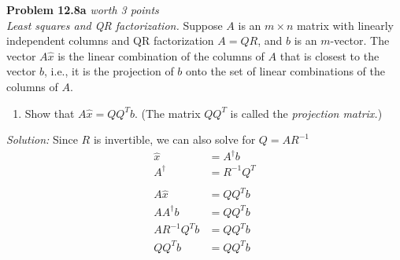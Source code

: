 \documentclass{article}
\newenvironment{problem}[3][Problem]
    { \begin{mdframed}[backgroundcolor=gray!20] \textbf{#1 #2} \textit{worth #3 points} \\}
    {  \end{mdframed}}
\newenvironment{solution}
    {\textit{Solution:}}
    {}
\begin{document}
\begin{problem}{12.8a}{3}
\textit{Least squares and QR factorization.} Suppose $A$ is an $m \times n$ matrix with linearly independent columns and QR factorization $A = QR$, and $b$ is an $m$-vector. The vector $A\hat{x}$ is the linear combination of the columns of $A$ that is closest to the vector $b$, i.e., it is the projection of $b$ onto the set of linear combinations of the columns of $A$.
\begin{enumerate}
    \item Show that $A\hat{x}=QQ^Tb.$ (The matrix $QQ^T$ is called the \textit{projection matrix.})
\end{enumerate}
\end{problem}
\begin{solution}
Since $R$ is invertible, we can also solve for $Q = AR^{-1}$
\begin{align*}
    \hat{x} &= A^{\dagger}b\\
    A^{\dagger} &= R^{-1}Q^T \\
    \\
    A\hat{x} &= QQ^Tb \\
    AA^{\dagger}b &= QQ^Tb \\
    AR^{-1}Q^Tb &= QQ^Tb\\
    QQ^Tb &= QQ^Tb
\end{align*}
\end{solution}
\end{document}
